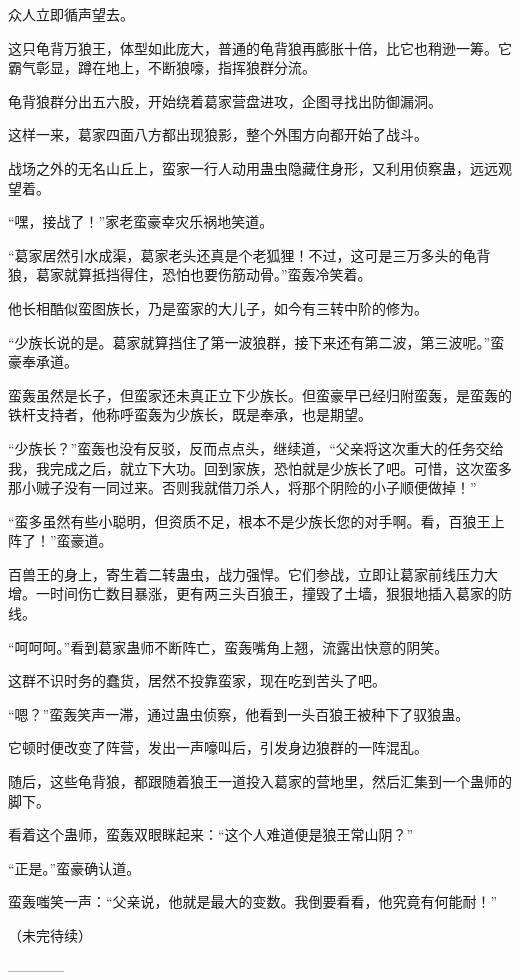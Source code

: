 \begin{this_body}
众人立即循声望去。

这只龟背万狼王，体型如此庞大，普通的龟背狼再膨胀十倍，比它也稍逊一筹。它霸气彰显，蹲在地上，不断狼嚎，指挥狼群分流。

龟背狼群分出五六股，开始绕着葛家营盘进攻，企图寻找出防御漏洞。

这样一来，葛家四面八方都出现狼影，整个外围方向都开始了战斗。

战场之外的无名山丘上，蛮家一行人动用蛊虫隐藏住身形，又利用侦察蛊，远远观望着。

“嘿，接战了！”家老蛮豪幸灾乐祸地笑道。

“葛家居然引水成渠，葛家老头还真是个老狐狸！不过，这可是三万多头的龟背狼，葛家就算抵挡得住，恐怕也要伤筋动骨。”蛮轰冷笑着。

他长相酷似蛮图族长，乃是蛮家的大儿子，如今有三转中阶的修为。

“少族长说的是。葛家就算挡住了第一波狼群，接下来还有第二波，第三波呢。”蛮豪奉承道。

蛮轰虽然是长子，但蛮家还未真正立下少族长。但蛮豪早已经归附蛮轰，是蛮轰的铁杆支持者，他称呼蛮轰为少族长，既是奉承，也是期望。

“少族长？”蛮轰也没有反驳，反而点点头，继续道，“父亲将这次重大的任务交给我，我完成之后，就立下大功。回到家族，恐怕就是少族长了吧。可惜，这次蛮多那小贼子没有一同过来。否则我就借刀杀人，将那个阴险的小子顺便做掉！”

“蛮多虽然有些小聪明，但资质不足，根本不是少族长您的对手啊。看，百狼王上阵了！”蛮豪道。

百兽王的身上，寄生着二转蛊虫，战力强悍。它们参战，立即让葛家前线压力大增。一时间伤亡数目暴涨，更有两三头百狼王，撞毁了土墙，狠狠地插入葛家的防线。

“呵呵呵。”看到葛家蛊师不断阵亡，蛮轰嘴角上翘，流露出快意的阴笑。

这群不识时务的蠢货，居然不投靠蛮家，现在吃到苦头了吧。

“嗯？”蛮轰笑声一滞，通过蛊虫侦察，他看到一头百狼王被种下了驭狼蛊。

它顿时便改变了阵营，发出一声嚎叫后，引发身边狼群的一阵混乱。

随后，这些龟背狼，都跟随着狼王一道投入葛家的营地里，然后汇集到一个蛊师的脚下。

看着这个蛊师，蛮轰双眼眯起来：“这个人难道便是狼王常山阴？”

“正是。”蛮豪确认道。

蛮轰嗤笑一声：“父亲说，他就是最大的变数。我倒要看看，他究竟有何能耐！”

（未完待续）

------------

\end{this_body}

